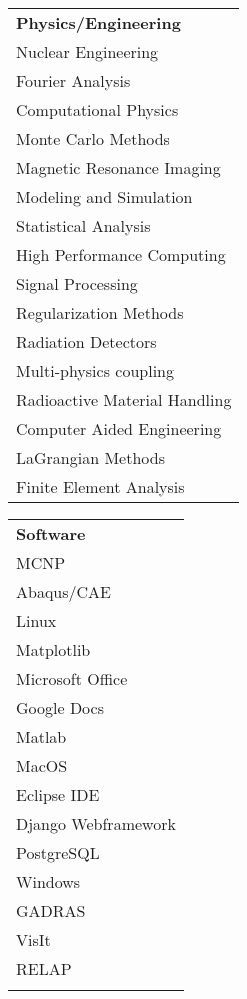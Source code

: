 \\[2mm]
\begin{minipage}{0.32\textwidth}
\begin{tabular}{l}
	{\large\textbf{Physics/Engineering}} \\
	\highskillbw Nuclear Engineering \\
	\highskillbw Fourier Analysis \\ 
	\highskillbw Computational Physics \\
	\highskillbw Monte Carlo Methods \\
	\highskillbw Magnetic Resonance Imaging \\ 
	\highskillbw Modeling and Simulation \\
	\medskillbw Statistical Analysis \\
	\medskillbw High Performance Computing \\
	\medskillbw Signal Processing \\
	\medskillbw Regularization Methods  \\
	\medskillbw Radiation Detectors \\
	\medskillbw Multi-physics coupling \\
	\medskillbw Radioactive Material Handling \\
	\lowskillbw Computer Aided Engineering \\
	\lowskillbw LaGrangian Methods \\
	\lowskillbw Finite Element Analysis \\
\end{tabular}
\end{minipage}%
\begin{minipage}{0.2\textwidth}
	\begin{center}
\begin{tabular}{l}
	{\large\textbf{Software}} \\
	\highskillbw \textsc{MCNP} \\
	\highskillbw Abaqus/CAE \\
	\highskillbw Linux \\ 
	\highskillbw Matplotlib \\ 
	\highskillbw Microsoft Office \\
	\highskillbw Google Docs \\
	\highskillbw Matlab \\
	\highskillbw MacOS \\
	\medskillbw Eclipse IDE \\
	\medskillbw Django Webframework \\
	\medskillbw PostgreSQL \\
	\medskillbw Windows \\
	\lowskillbw GADRAS \\
	\lowskillbw VisIt \\
	\lowskillbw RELAP \\
	\\
\end{tabular}
	\end{center}
\end{minipage}%
